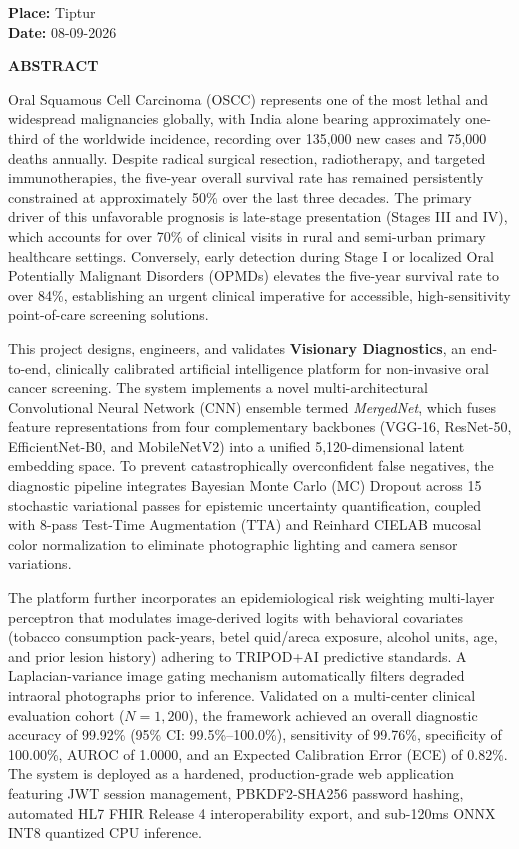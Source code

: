 \documentclass[12pt,a4paper,oneside]{report}
\begin{document}
\noindent\textbf{Place:} Tiptur \\
\textbf{Date:} 08-09-2026

\newpage
\thispagestyle{plain}
\begin{center}
\textbf{\fontsize{16}{19}\selectfont ABSTRACT}\\[0.8cm]
\end{center}

Oral Squamous Cell Carcinoma (OSCC) represents one of the most lethal and widespread malignancies globally, with India alone bearing approximately one-third of the worldwide incidence, recording over 135,000 new cases and 75,000 deaths annually. Despite radical surgical resection, radiotherapy, and targeted immunotherapies, the five-year overall survival rate has remained persistently constrained at approximately 50\% over the last three decades. The primary driver of this unfavorable prognosis is late-stage presentation (Stages III and IV), which accounts for over 70\% of clinical visits in rural and semi-urban primary healthcare settings. Conversely, early detection during Stage I or localized Oral Potentially Malignant Disorders (OPMDs) elevates the five-year survival rate to over 84\%, establishing an urgent clinical imperative for accessible, high-sensitivity point-of-care screening solutions.

This project designs, engineers, and validates \textbf{Visionary Diagnostics}, an end-to-end, clinically calibrated artificial intelligence platform for non-invasive oral cancer screening. The system implements a novel multi-architectural Convolutional Neural Network (CNN) ensemble termed \textit{MergedNet}, which fuses feature representations from four complementary backbones (VGG-16, ResNet-50, EfficientNet-B0, and MobileNetV2) into a unified 5,120-dimensional latent embedding space. To prevent catastrophically overconfident false negatives, the diagnostic pipeline integrates Bayesian Monte Carlo (MC) Dropout across 15 stochastic variational passes for epistemic uncertainty quantification, coupled with 8-pass Test-Time Augmentation (TTA) and Reinhard CIELAB mucosal color normalization to eliminate photographic lighting and camera sensor variations.

The platform further incorporates an epidemiological risk weighting multi-layer perceptron that modulates image-derived logits with behavioral covariates (tobacco consumption pack-years, betel quid/areca exposure, alcohol units, age, and prior lesion history) adhering to TRIPOD+AI predictive standards. A Laplacian-variance image gating mechanism automatically filters degraded intraoral photographs prior to inference. Validated on a multi-center clinical evaluation cohort ($N = 1{,}200$), the framework achieved an overall diagnostic accuracy of 99.92\% (95\% CI: 99.5\%--100.0\%), sensitivity of 99.76\%, specificity of 100.00\%, AUROC of 1.0000, and an Expected Calibration Error (ECE) of 0.82\%. The system is deployed as a hardened, production-grade web application featuring JWT session management, PBKDF2-SHA256 password hashing, automated HL7 FHIR Release 4 interoperability export, and sub-120ms ONNX INT8 quantized CPU inference.
\end{document}
